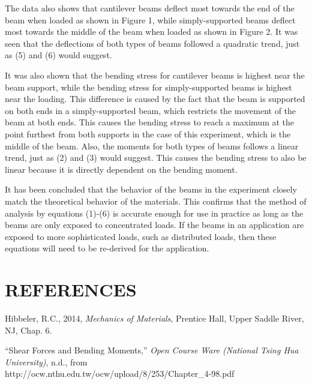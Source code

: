 \documentclass[12pt]{article}
\begin{document}
The data also shows that cantilever beams deflect most towards the end of the beam when loaded as shown in Figure 1, while simply-supported beams deflect most towards the middle of the beam when loaded as shown in Figure 2. It was seen that the deflections of both types of beams followed a quadratic trend, just as (5) and (6) would suggest.
\bigskip

It was also shown that the bending stress for cantilever beams is highest near the beam support, while the bending stress for simply-supported beams is highest near the loading. This difference is caused by the fact that the beam is supported on both ends in a simply-supported beam, which restricts the movement of the beam at both ends. This causes the bending stress to reach a maximum at the point furthest from both supports in the case of this experiment, which is the middle of the beam. Also, the moments for both types of beams follows a linear trend, just as (2) and (3) would suggest. This causes the bending stress to also be linear because it is directly dependent on the bending moment.
\bigskip

It has been concluded that the behavior of the beams in the experiment closely match the theoretical behavior of the materials. This confirms that the method of analysis by equations (1)-(6) is accurate enough for use in practice as long as the beams are only exposed to concentrated loads. If the beams in an application are exposed to more sophisticated loads, such as distributed loads, then these equations will need to be re-derived for the application.
\bigskip


\section*{\fontsize{12}{12}\selectfont REFERENCES}

\begin{thebibliography}{2}

\bibitem{}
Hibbeler, R.C., 2014, \emph{Mechanics of Materials}, Prentice Hall, Upper Saddle River, NJ, Chap. 6.

\bibitem{}
“Shear Forces and Bending Moments,” \emph{Open Course Ware (National Tsing Hua University)}, n.d., from
\\http://ocw.nthu.edu.tw/ocw/upload/8/253/Chapter\_4-98.pdf


\end{thebibliography}


\end{document}
